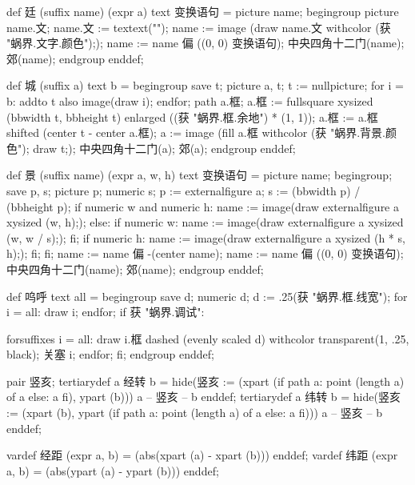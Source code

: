 \startMPinclusions[+]
def 廷 (suffix name) (expr a) text 变换语句 =
  picture name;
  begingroup
    picture name.文; name.文 := textext("");
    name := image (draw name.文 withcolor (获 "蜗界.文字.颜色"););
    name := name 偏 ((0, 0) 变换语句); 
    中央四角十二门(name); 郊(name);
  endgroup
enddef;
\stopMPinclusions

\startMPinclusions[+]
def 城 (suffix a) text b =
  begingroup
    save t;
    picture a, t; 
    t := nullpicture;
    for i = b: addto t also image(draw i); endfor;
    path a.框; 
    a.框 := fullsquare xysized (bbwidth t, bbheight t) 
            enlarged ((获 "蜗界.框.余地") * (1, 1));
    a.框 := a.框 shifted (center t - center a.框);
    a := image (fill a.框 withcolor (获 "蜗界.背景.颜色");
                draw t;);
    中央四角十二门(a); 郊(a);
  endgroup
enddef;
\stopMPinclusions

\startMPinclusions[+]
def 景 (suffix name) (expr a, w, h) text 变换语句 =
  picture name;
  begingroup;
  save p, s; picture p; numeric s;
  p := externalfigure a;
  s := (bbwidth p) / (bbheight p);
  if numeric w and numeric h:
    name := image(draw externalfigure a xysized (w, h););
  else:
    if numeric w:
      name := image(draw externalfigure a xysized (w, w / s););
    fi;
    if numeric h:
       name := image(draw externalfigure a xysized (h * s, h););
    fi;
  fi;
  name := name 偏 -(center name); %
  name := name 偏 ((0, 0) 变换语句); 
  中央四角十二门(name); 郊(name);
  endgroup
enddef;

def 呜呼 text all =
  begingroup
    save d; numeric d; d := .25(获 "蜗界.框.线宽");
    for i = all: 
      draw i; 
    endfor;
    if 获 "蜗界.调试":
      
      forsuffixes i = all: 
        draw i.框 dashed (evenly scaled d) withcolor transparent(1, .25, black);
        关塞 i; 
      endfor;
    fi;
  endgroup
enddef;
\stopMPinclusions

\startMPinclusions[+]
pair 竖亥;
tertiarydef a 经转 b =
  hide(竖亥 := (xpart (if path a: point (length a) of a else: a fi), ypart (b)))
  a -- 竖亥 -- b
enddef;
tertiarydef a 纬转 b =
  hide(竖亥 := (xpart (b), ypart (if path a: point (length a) of a else: a fi)))
  a --  竖亥 -- b
enddef;
\stopMPinclusions

\startMPinclusions[+]
vardef 经距 (expr a, b) = (abs(xpart (a) - xpart (b))) enddef;
vardef 纬距 (expr a, b) = (abs(ypart (a) - ypart (b))) enddef;
\stopMPinclusions

